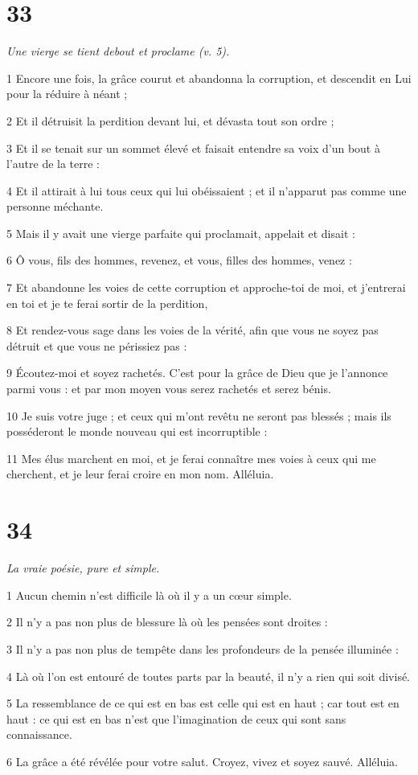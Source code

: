 \chapter{33}

\par \textit{Une vierge se tient debout et proclame (v. 5).}

\par 1 Encore une fois, la grâce courut et abandonna la corruption, et descendit en Lui pour la réduire à néant ;
\par 2 Et il détruisit la perdition devant lui, et dévasta tout son ordre ;
\par 3 Et il se tenait sur un sommet élevé et faisait entendre sa voix d'un bout à l'autre de la terre :
\par 4 Et il attirait à lui tous ceux qui lui obéissaient ; et il n'apparut pas comme une personne méchante.
\par 5 Mais il y avait une vierge parfaite qui proclamait, appelait et disait :
\par 6 Ô vous, fils des hommes, revenez, et vous, filles des hommes, venez :
\par 7 Et abandonne les voies de cette corruption et approche-toi de moi, et j'entrerai en toi et je te ferai sortir de la perdition,
\par 8 Et rendez-vous sage dans les voies de la vérité, afin que vous ne soyez pas détruit et que vous ne périssiez pas :
\par 9 Écoutez-moi et soyez rachetés. C'est pour la grâce de Dieu que je l'annonce parmi vous : et par mon moyen vous serez rachetés et serez bénis.
\par 10 Je suis votre juge ; et ceux qui m'ont revêtu ne seront pas blessés ; mais ils posséderont le monde nouveau qui est incorruptible :
\par 11 Mes élus marchent en moi, et je ferai connaître mes voies à ceux qui me cherchent, et je leur ferai croire en mon nom. Alléluia.



\chapter{34}

\par \textit{La vraie poésie, pure et simple.}

\par 1 Aucun chemin n'est difficile là où il y a un cœur simple.
\par 2 Il n'y a pas non plus de blessure là où les pensées sont droites :
\par 3 Il n'y a pas non plus de tempête dans les profondeurs de la pensée illuminée :
\par 4 Là où l'on est entouré de toutes parts par la beauté, il n'y a rien qui soit divisé.
\par 5 La ressemblance de ce qui est en bas est celle qui est en haut ; car tout est en haut : ce qui est en bas n'est que l'imagination de ceux qui sont sans connaissance.
\par 6 La grâce a été révélée pour votre salut. Croyez, vivez et soyez sauvé. Alléluia.

